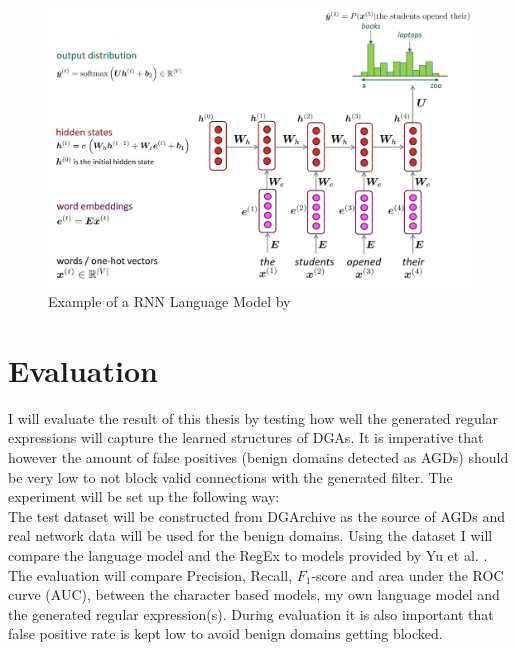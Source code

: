 \documentclass[a4paper, 12pt]{article}
\begin{document}
\begin{figure}[h]
    \includegraphics[width=\textwidth]{cs224n-spr2024-lecture05-language-model.png}
    \caption{Example of a RNN Language Model by \cite{manning_natural_2024}}
    \label{fig:RNNLanguageModel}
\end{figure}
\section{Evaluation}
I will evaluate the result of this thesis by testing how well the generated regular expressions
will capture the learned structures of DGAs.  It is imperative that however the amount of false
positives (benign domains detected as AGDs) should be very low to not block valid connections with
the generated filter.
The experiment will be set up the following way:\\
The test dataset will be constructed from DGArchive\cite{dgarchive_2024} as the source of AGDs and
real network data will be used for the benign domains.
Using the dataset I will compare the language model and the RegEx to models provided by Yu et al. 
\cite{yu_character_2018}. The evaluation will compare Precision, Recall,
$F_1$-score and area under the ROC curve (AUC), between the character based models, my own language
model and the generated regular expression(s).
During evaluation it is also important that false positive rate is kept low to avoid benign domains
getting blocked.
\end{document}
